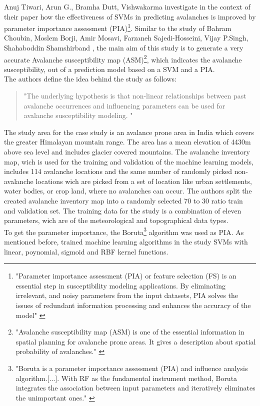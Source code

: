 \documentclass[../masterarbeit.tex]{subfiles}
\begin{document}
Anuj Tiwari, Arun G., Bramha Dutt, Vishwakarma \textcite[]{Tiwari:2021} investigate in the context of their paper how the effectiveness of SVMs in predicting avalanches is improved by parameter importance assessment (PIA)\footnote{ "Parameter importance assessment (PIA) or feature selection (FS) is an essential step in susceptibility modeling applications. By eliminating irrelevant, and noisy parameters from the input datasets, PIA solves the issues of redundant information processing and enhances the accuracy of the model" \autocite[]{Tiwari:2021} }.
Similar to the study of Bahram Choubin, Moslem Borji, Amir Mosavi, Farzaneh Sajedi-Hosseini, Vijay P.Singh, Shahaboddin Shamshirband \textcite[]{Bahram:2019}, the main aim of this study is to generate a very accurate Avalanche susceptibility map (ASM)\footnote{ "Avalanche susceptibility map (ASM) is one of the essential information in spatial planning for avalanche prone areas. It gives a description about spatial probability of avalanches." \autocite[]{Tiwari:2021}}, 
which indicates the avalanche susceptibility, out of a prediction model based on a SVM and a PIA. \autocite[]{Tiwari:2021} \\
The authors define the idea behind the study as follows:
\begin{quote}
	"The underlying hypothesis is that non-linear relationships between past avalanche occurrences and influencing parameters can be used for avalanche susceptibility modeling. " \autocite[]{Tiwari:2021} 
\end{quote}
The study area for the case study is an avalance prone area in India which covers the greater Himalayan mountain range. The area has a mean elevation of 4430m above sea level and includes glacier covered mountains. The avalanche inventory map, wich is used for the training and validation of the machine learning models, includes 114 avalanche locations and the same number of randomly picked non-avalanche locations wich are picked from a set of location like urban settlements, water bodies, or crop land, where no avalanches can occur. The authors split the created avalanche inventory map into a randomly selected 70 to 30 ratio train and validation set.
The training data for the study is a combination of eleven parameters, wich are of the meteorological and topographical data types. \autocite[]{Tiwari:2021} \\
To get the parameter importance, the Boruta\footnote{"Boruta is a parameter importance assessment (PIA) and influence analysis algorithm.[...]. With RF as the fundamental instrument method, Boruta integrates the association between input parameters and iteratively eliminates the unimportant ones." \autocite[]{Tiwari:2021}} algorithm was used as PIA. As mentioned before, trained machine learning algorithms in the study SVMs with linear, poynomial, sigmoid and RBF kernel functions.
\end{document}
